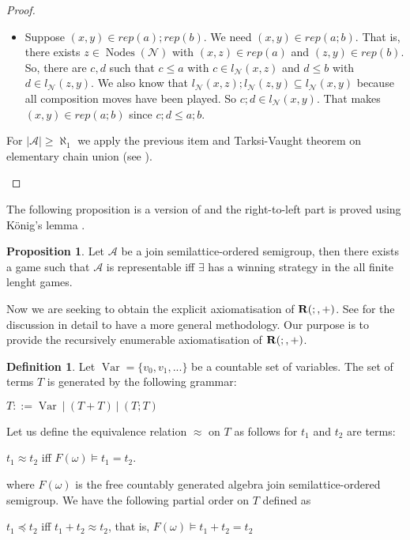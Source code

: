 \documentclass[a4paper]{article}
\theoremstyle{definition}
\newtheorem{definition}{Definition}
\theoremstyle{theorem}
\theoremstyle{proposition}
\newtheorem{proposition}{Proposition}
\theoremstyle{lemma}
\theoremstyle{ex}
\theoremstyle{corollary}
\theoremstyle{claim}
\begin{document}
\begin{proof}
\begin{enumerate}
\begin{itemize}
\item Suppose $(x, y) \in rep(a) ; rep(b)$. We need $(x, y) \in rep(a;b)$. That is, there exists $z \in \operatorname{Nodes}(\mathcal{N})$ with $(x, z) \in rep(a)$ and $(z, y) \in rep(b)$. So, there are $c, d$ such that $c \leq a$ with $c \in l_{\mathcal{N}}(x, z)$ and $d \leq b$ with $d \in l_{\mathcal{N}}(z, y)$.
We also know that $l_{\mathcal{N}}(x, z) ; l_{\mathcal{N}}(z, y) \subseteq l_{\mathcal{N}}(x, y)$ because all composition moves have been played.
So $c ; d \in l_{\mathcal{N}}(x, y)$. That makes $(x, y) \in rep(a;b)$ since $c ; d \leq a ; b$.

\end{itemize}
For $|\mathcal{A}| \geq \aleph_1$ we apply the previous item and Tarksi-Vaught theorem on elementary chain union (see \cite[Theorem 2.5.2]{hodges1997shorter}).
  \end{enumerate}
\end{proof}

The following proposition is a version of \cite[Proposition 7.24]{hirsch2002relation} and the right-to-left part is proved using K\"{o}nig's lemma \cite[Exercise 5.6.3]{hodges1997shorter}.

\begin{proposition}
  Let $\mathcal{A}$ be a join semilattice-ordered semigroup, then there exists a game such that $\mathcal{A}$ is representable iff $\exists$ has a winning strategy in the all finite lenght games.
\end{proposition}

Now we are seeking to obtain the explicit axiomatisation of ${\bf R}(;, +)$. See \cite[Chapter 9]{hirsch2002relation} for the discussion in detail to have a more general methodology. Our purpose is to provide the recursively enumerable axiomatisation of ${\bf R}(;, +)$.

\begin{definition}
  Let $\operatorname{Var} = \{ v_0, v_1, ... \}$ be a countable set of variables. The set of terms $T$ is generated by the following grammar:

  \begin{center}
    $T ::= \operatorname{Var} \: | \: (T + T) \: | \: (T ; T)$
  \end{center}
\end{definition}

Let us define the equivalence relation $\approx$ on $T$ as follows for $t_1$ and $t_2$ are terms:
\begin{center}
$t_1 \approx t_2$ iff $F(\omega) \models t_1 = t_2$.
\end{center}
where $F(\omega)$ is the free countably generated algebra join semilattice-ordered semigroup.
We have the following partial order on $T$ defined as
\begin{center}
  $t_1 \preceq t_2$ iff $t_1 + t_2 \approx t_2$, that is, $F(\omega) \models t_1 + t_2 = t_2$
\end{center}
\end{document}
